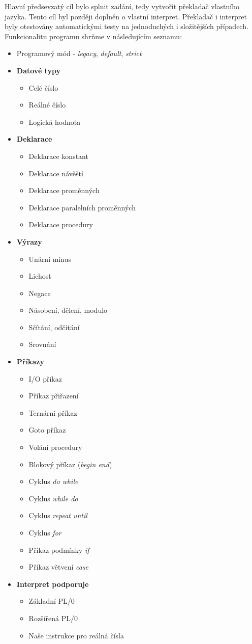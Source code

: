 \documentclass[
12pt,
a4paper,
pdftex,
czech,
titlepage
]{report}
\begin{document}
Hlavní předsevzatý cíl bylo splnit zadání, tedy vytvořit překladač vlastního jazyka. Tento cíl byl později doplněn o vlastní interpret. Překladač i interpret byly otestovány automatickými testy na jednoduchých i složitějších případech. Funkcionalitu programu shrňme v následujícím seznamu:
\begin{itemize}
\item Programový mód - \textit{legacy}, \textit{default}, \textit{strict}
\item \textbf{Datové typy}
\begin{itemize}
\item Celé číslo
\item Reálné číslo
\item Logická hodnota
\end{itemize}
\item \textbf{Deklarace}
\begin{itemize}
\item Deklarace konstant
\item Deklarace návěští
\item Deklarace proměnných
\item Deklarace paralelních proměnných
\item Deklarace procedury
\end{itemize}
\item \textbf{Výrazy}
\begin{itemize}
\item Unární mínus
\item Lichost
\item Negace
\item Násobení, dělení, modulo
\item Sčítání, odčítání
\item Srovnání
\end{itemize}
\item \textbf{Příkazy}
\begin{itemize}
\item I/O příkaz
\item Příkaz přiřazení
\item Ternární příkaz
\item Goto příkaz
\item Volání procedury
\item Blokový příkaz (\textit{begin end})
\item Cyklus \textit{do while}
\item Cyklus \textit{while do}
\item Cyklus \textit{repeat until}
\item Cyklus \textit{for}
\item Příkaz podmínky \textit{if}
\item Příkaz větvení \textit{case}
\end{itemize}
\item \textbf{Interpret podporuje}
\begin{itemize}
\item Základní PL/0
\item Rozšířená PL/0
\item Naše instrukce pro reálná čísla
\end{itemize}
\end{itemize}
\end{document}
